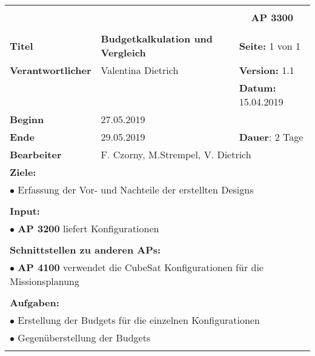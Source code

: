 \clearpage
\begin{table}[!h]
 \begin{center}
  \begin{tabular}{|p{35mm}||p{55mm}|p{50mm}||p{40mm}|}
   \hline
   \multicolumn{3}{|l||}{\textbf{}} & \multicolumn{1}{c|}{}\\
   \multicolumn{3}{|l||}{\textbf{}} & \multicolumn{1}{c|}{\textbf{AP 3300}}\\
   \multicolumn{3}{|l||}{\textbf{}} & \multicolumn{1}{c|}{}\\
   \hline\hline
   \textbf{Titel} & \multicolumn{2}{p{7cm}||}{\textbf{Budgetkalkulation und Vergleich}} & \textbf{Seite:} 1 von 1\\
   \hline
   \textbf{Verantwortlicher} & \multicolumn{2}{l||}{Valentina Dietrich} & \textbf{Version:} 1.1\\
   \hline
   \multicolumn{3}{|l||}{} & \textbf{Datum:} 15.04.2019\\
   \hline\hline
   \textbf{Beginn} & \multicolumn{2}{l||}{27.05.2019} & \\
   \hline
   \textbf{Ende} & \multicolumn{2}{l||}{29.05.2019} & \textbf{Dauer}: 2 Tage\\
   \hline\hline
   \textbf{Bearbeiter} & \multicolumn{3}{l|}{F. Czorny, M.Strempel, V. Dietrich}\\
   \hline\hline
   \multicolumn{4}{|p{150mm}|}{\textbf{Ziele:}}\\
   \multicolumn{4}{|p{150mm}|}{$\bullet$ Erfassung der Vor- und Nachteile der erstellten Designs}\\
   \multicolumn{4}{|p{150mm}|}{}\\
   \multicolumn{4}{|p{150mm}|}{\textbf{Input:}}\\
   \multicolumn{4}{|p{150mm}|}{$\bullet$ \textbf{AP 3200} liefert Konfigurationen}\\
   \multicolumn{4}{|p{150mm}|}{}\\
   \multicolumn{4}{|p{150mm}|}{\textbf{Schnittstellen zu anderen APs:}}\\
   \multicolumn{4}{|p{150mm}|}{$\bullet$ \textbf{AP 4100} verwendet die CubeSat Konfigurationen für die Missionsplanung}\\
   \multicolumn{4}{|p{150mm}|}{}\\
   \multicolumn{4}{|p{150mm}|}{\textbf{Aufgaben:}}\\
   \multicolumn{4}{|p{150mm}|}{$\bullet$ Erstellung der Budgets für die einzelnen Konfigurationen}\\
   \multicolumn{4}{|p{150mm}|}{$\bullet$ Gegenüberstellung der Budgets}\\
   \multicolumn{4}{|p{150mm}|}{}\\
   \hline
  \end{tabular}
 \end{center}
\end{table}

